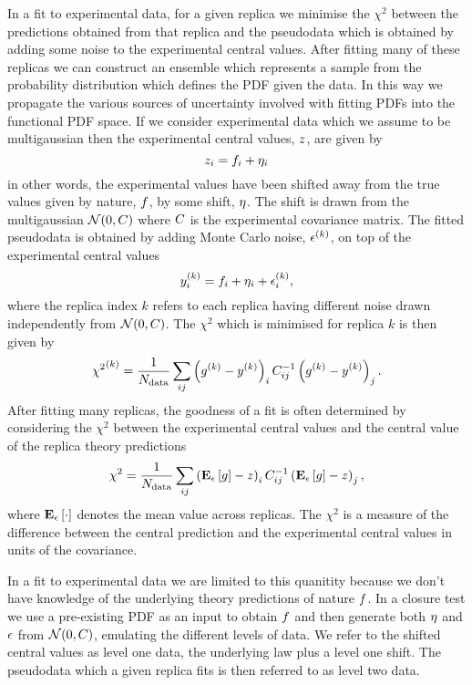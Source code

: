 In a fit to experimental data, for a given replica we minimise the $\chi^2$
between the predictions obtained from that replica and the pseudodata which is
obtained by adding some noise to the experimental central values. After fitting
many of these replicas we can construct an ensemble which represents a sample
from the probability distribution which defines the PDF given the data. In this
way we propagate the various sources of uncertainty involved with fitting PDFs
into the functional PDF space. If we consider experimental data which we assume
to be multigaussian then the experimental central values, $z$, are given by
\begin{equation}
    z_{i} = f_i + \eta_i
\end{equation}
in other words, the experimental values have been shifted away from the true
values given by nature, $f$, by some shift, $\eta$. The shift is drawn from
the multigaussian $\mathcal{N}(0, C)$ where $C$ is the experimental covariance
matrix. The fitted pseudodata is obtained by adding Monte Carlo noise, $\epsilon^{(k)}$,
on top of the experimental central values
\begin{equation}
    y^{(k)}_{i} = f_i + \eta_i + \epsilon^{(k)}_{i},
\end{equation}
where the replica index $k$ refers to each replica having different noise drawn
independently from $\mathcal{N}(0, C)$. The $\chi^2$ which is minimised for
replica $k$ is then given by
\begin{equation}
    {\chi^2}^{(k)} = \frac{1}{N_{\rm data}} \sum_{ij} \left( g^{(k)} - y^{(k)} \right)_i C^{-1}_{ij} \left( g^{(k)} - y^{(k)} \right)_j.
\end{equation}
After fitting many replicas, the goodness of a fit is often determined by
considering the $\chi^2$ between the experimental central values and the
central value of the replica theory predictions
\begin{equation}
    \chi^2 = \frac{1}{N_{\rm data}} \sum_{ij} \left( \mathbf{E}_{\epsilon}\left[ g \right] - z \right)_i C^{-1}_{ij} \left( \mathbf{E}_{\epsilon}\left[ g \right] - z \right)_j,
\end{equation}
where $\mathbf{E}_{\epsilon}\left[ \cdot \right]$ denotes the mean value across replicas. The $\chi^2$ is a
measure of the difference between the central prediction and the experimental
central values in units of the covariance.

In a fit to
experimental data we are limited to this quanitity because we don't have knowledge
of the underlying theory predictions of nature $f$. In a closure test we use
a pre-existing PDF as an input to obtain $f$ and then generate both
$\eta$ and $\epsilon$ from $\mathcal{N}(0, C)$, emulating the different levels
of data. We refer to the shifted central values as level one data, the underlying
law plus a level one shift. The pseudodata which a given replica fits is then
referred to as level two data.
